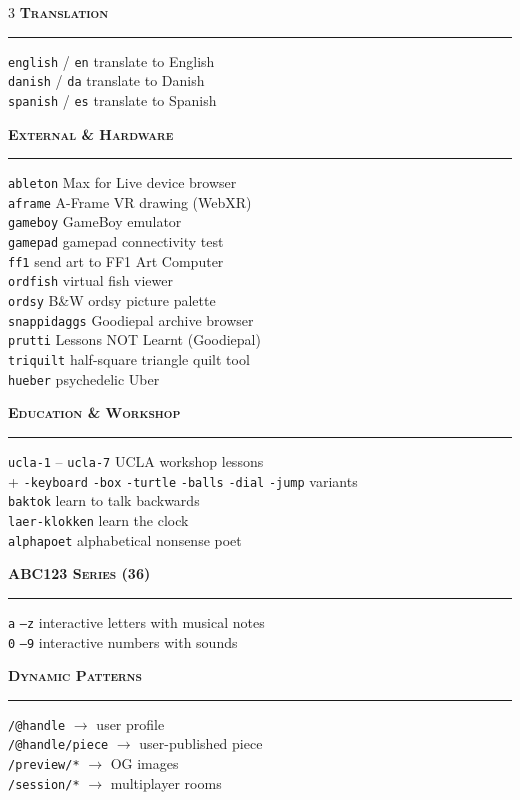 \documentclass[10pt,letterpaper,twocolumn]{article}
\newcommand{\pe}[2]{\texttt{\color{acpurple}#1} #2}
\newcommand{\peh}[1]{\vspace{0.3em}\noindent\textbf{\textsc{#1}}\par\vspace{0.1em}\hrule\vspace{0.2em}}
\begin{document}
\begin{multicols}{3}
\peh{Translation}
\pe{english}{/ \texttt{\color{acpurple}en} translate to English}\\
\pe{danish}{/ \texttt{\color{acpurple}da} translate to Danish}\\
\pe{spanish}{/ \texttt{\color{acpurple}es} translate to Spanish}

\peh{External \& Hardware}
\pe{ableton}{Max for Live device browser}\\
\pe{aframe}{A-Frame VR drawing (WebXR)}\\
\pe{gameboy}{GameBoy emulator}\\
\pe{gamepad}{gamepad connectivity test}\\
\pe{ff1}{send art to FF1 Art Computer}\\
\pe{ordfish}{virtual fish viewer}\\
\pe{ordsy}{B\&W ordsy picture palette}\\
\pe{snappidaggs}{Goodiepal archive browser}\\
\pe{prutti}{Lessons NOT Learnt (Goodiepal)}\\
\pe{triquilt}{half-square triangle quilt tool}\\
\pe{hueber}{psychedelic Uber}

\peh{Education \& Workshop}
\pe{ucla-1}{-- \texttt{\color{acpurple}ucla-7} UCLA workshop lessons}\\
+ \texttt{\color{acpurple}-keyboard} \texttt{\color{acpurple}-box} \texttt{\color{acpurple}-turtle} \texttt{\color{acpurple}-balls} \texttt{\color{acpurple}-dial} \texttt{\color{acpurple}-jump} variants\\
\pe{baktok}{learn to talk backwards}\\
\pe{laer-klokken}{learn the clock}\\
\pe{alphapoet}{alphabetical nonsense poet}

\peh{ABC123 Series (36)}
\pe{a}{\texttt{\color{acpurple}--z} interactive letters with musical notes}\\
\pe{0}{\texttt{\color{acpurple}--9} interactive numbers with sounds}

\peh{Dynamic Patterns}
\pe{/@handle}{$\rightarrow$ user profile}\\
\pe{/@handle/piece}{$\rightarrow$ user-published piece}\\
\pe{/preview/*}{$\rightarrow$ OG images}\\
\pe{/session/*}{$\rightarrow$ multiplayer rooms}

\end{multicols}
\end{document}
